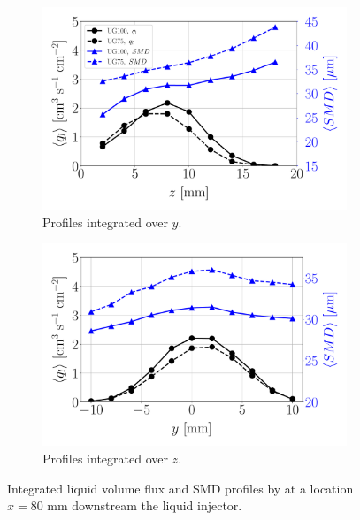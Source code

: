 \begin{figure}[h!]
\flushleft
\begin{subfigure}[b]{0.45\textwidth}
	\flushleft
   \includegraphics[scale=0.275]{./part2_developments/figures_ch6_lagrangian_JICF/expe_results/integrated_fluxes_along_y}
   \caption{Profiles integrated over $y$.}
  \label{fig:integrated_results_Becker_expe_results_over_y} 
\end{subfigure}
\hspace{0.3in}
\begin{subfigure}[b]{0.45\textwidth}
	\centering
   \includegraphics[scale=0.275]{./part2_developments/figures_ch6_lagrangian_JICF/expe_results/integrated_fluxes_along_z}
   \caption{Profiles integrated over $z$.}
  \label{fig:integrated_results_Becker_expe_results_over_z}
\end{subfigure}
\caption[{Integrated liquid volume flux and SMD profiles by  at a location $x = 80$ mm downstream the liquid injector.}]{Integrated liquid volume flux and SMD profiles by  at a location $x = 80$ mm downstream the liquid injector. }
\label{fig:integrated_results_Becker_expe_results}
\end{figure}

